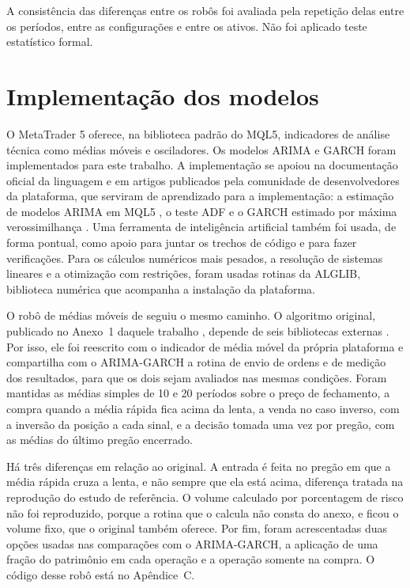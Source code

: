 A consistência das diferenças entre os robôs foi avaliada pela repetição delas
entre os períodos, entre as configurações e entre os ativos. Não foi aplicado teste
estatístico formal.

\section{Implementação dos modelos}

O MetaTrader 5 oferece, na biblioteca padrão do MQL5, indicadores de análise
técnica como médias móveis e osciladores. Os modelos ARIMA e GARCH foram
implementados para este
trabalho. A implementação se apoiou na documentação oficial da linguagem
\cite{metaquotesMql5} e em artigos publicados pela comunidade de desenvolvedores
da plataforma, que serviram de aprendizado para a implementação: a estimação de
modelos ARIMA em MQL5 \cite{dube2023}, o teste ADF \cite{dube2024} e o GARCH
estimado por máxima verossimilhança \cite{chernish2024}. Uma ferramenta
de inteligência artificial também foi usada, de forma pontual, como apoio para
juntar os trechos de código e para fazer verificações.
Para os cálculos
numéricos mais pesados, a resolução de sistemas lineares e a otimização com
restrições, foram usadas rotinas da ALGLIB, biblioteca numérica que acompanha a
instalação da plataforma.

O robô de médias móveis de  seguiu o mesmo caminho. O
algoritmo original, publicado no Anexo~1 daquele trabalho
\cite[p.~69-77]{almeida2016}, depende de seis bibliotecas externas
\cite[p.~35]{almeida2016}. Por isso, ele foi reescrito com o indicador de média
móvel da própria plataforma e compartilha com o ARIMA-GARCH a rotina de envio de
ordens e de medição dos resultados, para que os dois sejam avaliados nas mesmas
condições. Foram mantidas as médias simples de 10 e 20 períodos sobre o preço de
fechamento, a compra quando a média rápida fica acima da lenta, a venda no caso
inverso, com a inversão da posição a cada sinal, e a decisão tomada uma vez por
pregão, com as médias do último pregão encerrado.

Há três diferenças em relação ao original. A entrada é feita no pregão em que a
média rápida cruza a lenta, e não sempre que ela está acima, diferença tratada na
reprodução do estudo de referência. O volume calculado por porcentagem de risco
não foi reproduzido, porque a rotina que o calcula não consta do anexo, e ficou o
volume fixo, que o original também oferece. Por fim, foram acrescentadas duas
opções usadas nas comparações com o ARIMA-GARCH, a aplicação de uma fração do
patrimônio em cada operação e a operação somente na compra. O código desse robô
está no Apêndice~C.


